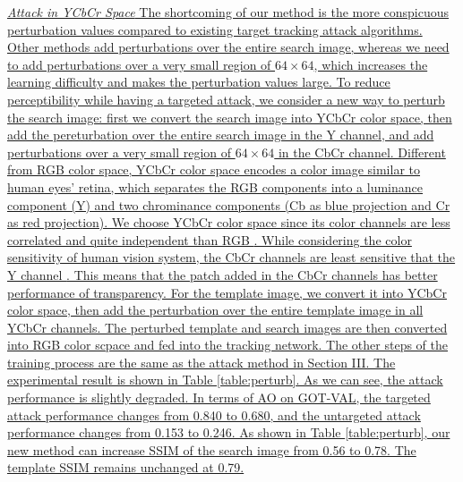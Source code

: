 \documentclass[12pt]{article}
\begin{document}
\uline{\textit{Attack in YCbCr Space}
The shortcoming of our method is the more conspicuous perturbation values compared to existing target tracking attack algorithms.
Other methods add perturbations over the entire search image, whereas we need to add perturbations over a very small region of $64 \times 64$, which increases the learning difficulty and makes the perturbation values large.
To reduce perceptibility while having a targeted attack, we consider a new way to perturb the search image: first we convert the search image into YCbCr color space, then add the pereturbation over the entire search image in the Y channel, and add perturbations over a very small region of $64 \times 64$ in the CbCr channel.%
Different from RGB color space, YCbCr color space encodes a color image similar to human eyes’ retina, which separates the RGB components into a luminance component (Y) and two chrominance components (Cb as blue projection and Cr as red projection).
We choose YCbCr color space since its color channels are less correlated and quite independent than RGB \cite{8630918}.
While considering the color sensitivity of human vision system, the CbCr channels are least sensitive that the Y channel \cite{8630918}. This means that the patch added in the CbCr channels has better performance of transparency.
For the template image, we convert it into YCbCr color space, then add the perturbation over the entire template image in all YCbCr channels.
The perturbed template and search images are then converted into RGB color scpace and fed into the tracking network.
The other steps of the training process are the same as the attack method in Section III.
The experimental result is shown in Table \ref{table:perturb}. As we can see,
the attack performance is slightly degraded. In terms of AO on GOT-VAL, the targeted attack performance changes from 0.840 to 0.680, and the untargeted attack performance changes from 0.153 to 0.246.
As shown in Table \ref{table:perturb},
our new method can increase SSIM of the search image from 0.56 to 0.78. The template SSIM remains unchanged at 0.79.
}
\end{document}
